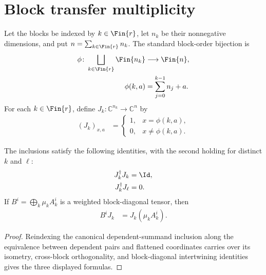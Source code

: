 \section{Block transfer multiplicity}

\begin{definition}
    \label{def:mpu_dependent_block_inclusion}
    \leanok
    Let the blocks be indexed by $k\in\Fin{r}$, let $n_k$ be their
    nonnegative dimensions, and put $n=\sum_{k\in\Fin{r}}n_k$.  The standard
    block-order bijection is
    \begin{align}
        \phi\colon \bigsqcup_{k\in\Fin{r}}\Fin{n_k}
                  & \longrightarrow \Fin{n}, \\
        \phi(k,a) & =\sum_{j=0}^{k-1}n_j+a.
    \end{align}
    For each $k\in\Fin{r}$, define $J_k:\mathbb C^{n_k}\to\mathbb C^n$ by
    \begin{align}
        (J_k)_{x,a} & =\begin{cases}
                           1, & x=\phi(k,a),   \\
                           0, & x\ne\phi(k,a).
                       \end{cases}
    \end{align}
\end{definition}

\begin{lemma}
    \label{thm:mpu_dependent_block_inclusion_identities}
    \leanok
    The inclusions satisfy the following identities, with the second holding
    for distinct $k$ and $\ell$:
    \begin{align}
        J_k^\dagger J_k    & =\Id, \\
        J_k^\dagger J_\ell & =0.
    \end{align}
    If $B^i=\bigoplus_k\mu_k A_k^i$ is a weighted block-diagonal tensor,
    then
    \begin{align}
        B^iJ_k & =J_k(\mu_kA_k^i).
    \end{align}
\end{lemma}

\begin{proof}\leanok
    Reindexing the canonical dependent-summand inclusion along the equivalence
    between dependent pairs and flattened coordinates carries over its
    isometry, cross-block orthogonality, and block-diagonal intertwining
    identities gives the three displayed formulas.
\end{proof}

